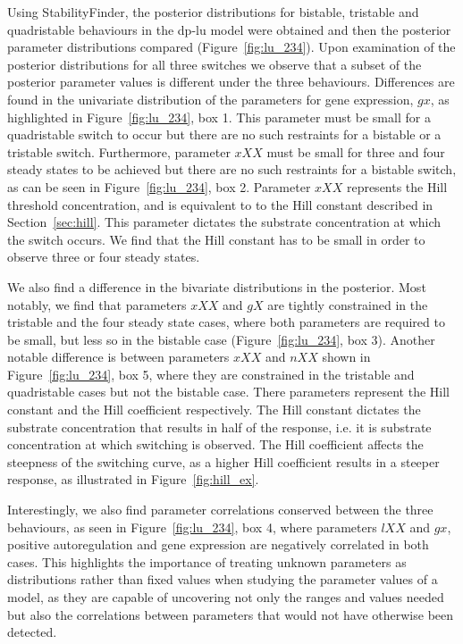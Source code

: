  Using StabilityFinder, the posterior distributions for bistable, tristable and quadristable behaviours in the \acrshort{dp-lu} model were obtained and then the posterior parameter distributions compared (Figure~\ref{fig:lu_234}). Upon examination of the posterior distributions for all three switches we observe that a subset of the posterior parameter values is different under the three behaviours. Differences are found in the univariate distribution of the parameters for gene expression, $gx$, as highlighted in Figure~\ref{fig:lu_234}, box 1. This parameter must be small for a quadristable switch to occur but there are no such restraints for a bistable or a tristable switch. Furthermore, parameter $xXX$ must be small for three and four steady states to be achieved but there are no such restraints for a bistable switch, as can be seen in Figure~\ref{fig:lu_234}, box 2. Parameter $xXX$ represents the Hill threshold concentration, and is equivalent to to the Hill constant described in Section~\ref{sec:hill}. This parameter dictates the substrate concentration at which the switch occurs. We find that the Hill constant has to be small in order to observe three or four steady states.

We also find a difference in the bivariate distributions in the posterior. Most notably, we find that parameters $xXX$ and $gX$ are tightly constrained in the tristable and the four steady state cases, where both parameters are required to be small, but less so in the bistable case (Figure~\ref{fig:lu_234}, box 3). Another notable difference is between parameters $xXX$ and $nXX$ shown in Figure~\ref{fig:lu_234}, box 5, where they are constrained in the tristable and quadristable cases but not the bistable case. There parameters represent the Hill constant and the Hill coefficient respectively. The Hill constant dictates the substrate concentration that results in half of the response, i.e. it is substrate concentration at which switching is observed. The Hill coefficient affects the steepness of the switching curve, as a higher Hill coefficient results in a steeper response, as illustrated in Figure~\ref{fig:hill_ex}.

Interestingly, we also find parameter correlations conserved between the three behaviours, as seen in Figure~\ref{fig:lu_234}, box 4, where parameters $lXX$ and $gx$, positive autoregulation and gene expression are negatively correlated in both cases.  This highlights the importance of treating unknown parameters as distributions rather than fixed values when studying the parameter values of a model, as they are capable of uncovering not only the ranges and values needed but also the correlations between parameters that would not have otherwise been detected. 






